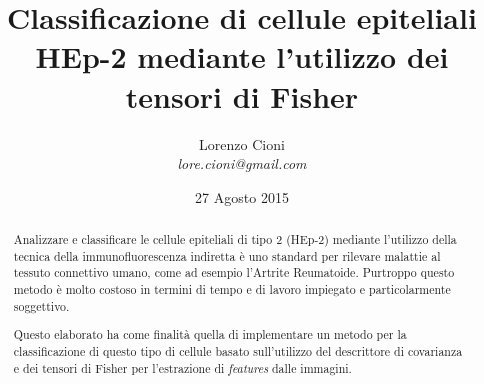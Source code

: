 \documentclass[a4paper,12pt]{article}
\title{\bf Classificazione di cellule epiteliali HEp-2 mediante l'utilizzo dei tensori di Fisher}
\date {27 Agosto 2015}
\author{Lorenzo Cioni\\\textit{{\small lore.cioni@gmail.com}}}
\begin{document}
\maketitle

\begin{abstract}

Analizzare e classificare le cellule epiteliali di tipo 2 (HEp-2) mediante l'utilizzo della tecnica della immunofluorescenza indiretta è uno standard per rilevare malattie al tessuto connettivo umano, come ad esempio l'Artrite Reumatoide. Purtroppo questo metodo è molto costoso in termini di tempo e di lavoro impiegato e particolarmente soggettivo.

Questo elaborato ha come finalità quella di implementare un metodo per la classificazione di questo tipo di cellule basato sull'utilizzo del descrittore di covarianza e dei tensori di Fisher per l'estrazione di \emph{features} dalle immagini.
\end{abstract}

\tableofcontents








\end{document}
